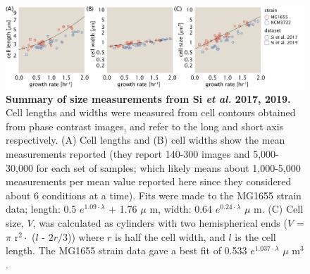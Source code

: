 \begin{figure}
		\centering
    \includegraphics[width=1.0\textwidth]{SI_figs/final_cell_size_Si.pdf}
  \caption{\textbf{Summary of size measurements from Si \textit{et al.} 2017, 2019.}
	 	 Cell lengths and widths were measured from cell contours obtained from
	 	 phase contrast images, and refer to the long and short axis respectively.
	 	 (A) Cell lengths and (B) cell widths show the mean measurements reported
	 	 (they report 140-300 images and 5,000-30,000 for each set of samples;
	 	 which likely means about 1,000-5,000 measurements per mean value reported
	 	 here since they considered about 6 conditions at a time). Fits were made
	 	 to the  MG1655 strain data; length: 0.5 $e^{1.09 \cdot \lambda}$ + 1.76
	 	 $\mu$ m, width:  0.64 $e^{0.24 \cdot \lambda}$ $\mu$ m. (C) Cell size,
	 	 $V$, was calculated as cylinders with two hemispherical ends ($V$ = $\pi$
	 	 r$^2 \cdot$ ($l$ - $2r/3$)) where $r$ is half the cell width, and $l$ is
	 	 the cell length. The MG1655 strain data gave a best fit of 0.533 $e^{1.037
	 	 \cdot \lambda}$ $\mu$ m$^3$.}
  \label{fig:final_size_data_Si}
\end{figure}
